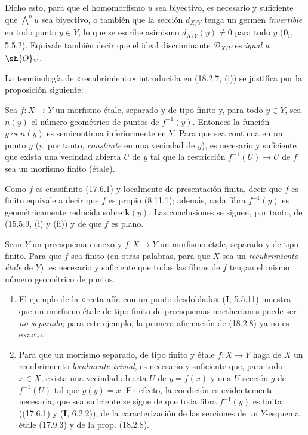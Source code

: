 
Dicho esto, para que el homomorfismo $u$ sea biyectivo, es necesario y suficiente que $\bigwedge^n u$ sea biyectivo, o también que la sección $d_{X/Y}$ tenga un germen \emph{invertible} en todo punto $y\in Y$, lo que se escribe asimismo $d_{X/Y}(y)\neq 0$ para todo $y$ ($\mathbf{0}_{\mathrm I}$, 5.5.2). Equivale también decir que el ideal discriminante $\mathscr{D}_{X/Y}$ es \emph{igual a $\sh{O}_Y$}.

La terminología de «recubrimiento» introducida en (18.2.7, (i)) se justifica por la proposición siguiente:

\begin{proposition}[18.2.8]
\label{IV.18.2.8}
Sea $f:X\to Y$ un morfismo étale, separado y de tipo finito y, para todo $y\in Y$, sea $n(y)$ el número geométrico de puntos de $f^{-1}(y)$. Entonces la función $y\leadsto n(y)$ es semicontinua inferiormente en $Y$. Para que sea continua en un punto $y$ \textup{(y, por tanto, \emph{constante} en una vecindad de $y$)}, es necesario y suficiente que exista una vecindad abierta $U$ de $y$ tal que la restricción $f^{-1}(U)\to U$ de $f$ sea un morfismo finito (étale).
\end{proposition}

Como $f$ es cuasifinito (17.6.1) y localmente de presentación finita, decir que $f$ es finito equivale a decir que $f$ es propio (8.11.1); además, cada fibra $f^{-1}(y)$ es geométricamente reducida sobre $\boldsymbol{k}(y)$. Las conclusiones se siguen, por tanto, de (15.5.9, (i) y (ii)) y de que $f$ es plano.

\begin{corollary}[18.2.9]
\label{IV.18.2.9}
Sean $Y$ un preesquema conexo y $f:X\to Y$ un morfismo étale, separado y de tipo finito. Para que $f$ sea finito \textup{(en otras palabras, para que $X$ sea un \emph{recubrimiento étale} de $Y$)}, es necesario y suficiente que todas las fibras de $f$ tengan el mismo número geométrico de puntos.
\end{corollary}

\begin{remarks}[18.2.10]
\label{IV.18.2.10}
\begin{enumerate}
  \item[(i)] El ejemplo de la «recta afín con un punto desdoblado» (\textbf I, 5.5.11) muestra que un morfismo étale de tipo finito de preesquemas noetherianos puede ser \emph{no separado}; para este ejemplo, la primera afirmación de (18.2.8) ya no es exacta.

  \item[(ii)] Para que un morfismo separado, de tipo finito y étale $f:X\to Y$ haga de $X$ un recubrimiento \emph{localmente trivial}, es necesario y suficiente que, para todo $x\in X$, exista una vecindad abierta $U$ de $y=f(x)$ y una $U$-sección $g$ de $f^{-1}(U)$ tal que $g(y)=x$. En efecto, la condición es evidentemente necesaria; que sea suficiente se sigue de que toda fibra $f^{-1}(y)$ es finita ((17.6.1) y (\textbf I, 6.2.2)), de la caracterización de las secciones de un $Y$-esquema étale (17.9.3) y de la prop. (18.2.8).
\end{enumerate}
\end{remarks}
